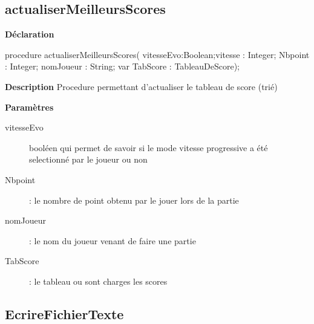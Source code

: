 \documentclass{report}
\newif\ifpdf
\begin{document}
\subsection*{actualiserMeilleursScores}
\fi
\label{GestionScore-actualiserMeilleursScores}
\begin{list}{}{
\setlength{\itemindent}{0cm}
\setlength{\listparindent}{0cm}
\setlength{\leftmargin}{\evensidemargin}
\addtolength{\leftmargin}{\tmplength}
\settowidth{\labelsep}{X}
\addtolength{\leftmargin}{\labelsep}
\setlength{\labelwidth}{\tmplength}
}
\item[\textbf{Déclaration}\hfill]
\ifpdf
\begin{flushleft}
\fi
\begin{ttfamily}
procedure actualiserMeilleursScores( vitesseEvo:Boolean;vitesse : Integer; Nbpoint : Integer; nomJoueur : String; var TabScore : TableauDeScore);\end{ttfamily}

\ifpdf
\end{flushleft}
\fi

\par
\item[\textbf{Description}]
Procedure permettant d'actualiser le tableau de score (trié)    \par
\item[\textbf{Paramètres}]
\begin{description}
\item[vitesseEvo] booléen qui permet de savoir si le mode vitesse progressive a été selectionné par le joueur ou non
\item[Nbpoint] : le nombre de point obtenu par le jouer lors de la partie
\item[nomJoueur] : le nom du joueur venant de faire une partie
\item[TabScore] : le tableau ou sont charges les scores
\end{description}


\end{list}
\ifpdf
\subsection*{\large{\textbf{EcrireFichierTexte}}\normalsize\hspace{1ex}\hrulefill}
\else
\end{document}
